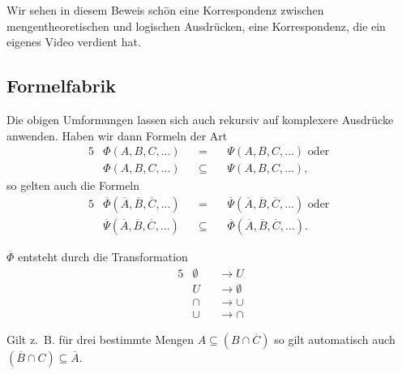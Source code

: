 \documentclass[a4paper]{amsart}
\theoremstyle{definition}
\newcommand{\zb}{z.~B. }
\begin{document}
Wir sehen in diesem Beweis schön eine Korrespondenz zwischen mengentheoretischen und logischen Ausdrücken, eine Korrespondenz, die ein eigenes Video verdient hat.

\subsection{Formelfabrik}
Die obigen Umformungen lassen sich auch rekursiv auf komplexere Ausdrücke anwenden. Haben wir dann Formeln der Art 
\begin{alignat}{5}
   &\Phi( A,B,C, ...) &&=         &&\, \Psi( A, B, C, ... ) \text{ oder }\\
   &\Phi( A,B,C, ...) &&\subseteq &&\, \Psi( A, B, C, ... ),
\end{alignat}
so gelten auch die Formeln
\begin{alignat}{5}
   &\overline\Phi( \overline A,\overline B,\overline C, ...) &&=         &&\, \overline \Psi( \overline A, \overline B, \overline C, ... ) \text{ oder }\\
   &\overline\Psi( \overline A,\overline B,\overline C, ...) &&\subseteq &&\, \overline \Phi( \overline A, \overline B, \overline C, ... ).
\end{alignat}

$\overline\Phi$ entsteht durch die Transformation
\begin{alignat}{5}
   &\emptyset &&\rightarrow U\\
   &U         &&\rightarrow \emptyset\\
   &\cap      &&\rightarrow \cup\\
   &\cup      &&\rightarrow \cap
\end{alignat}

Gilt \zb für drei bestimmte Mengen $A \subseteq (B \cap \overline  C)$ so gilt automatisch auch $(\overline B \cap C)  \subseteq \overline A$.

\end{document}
